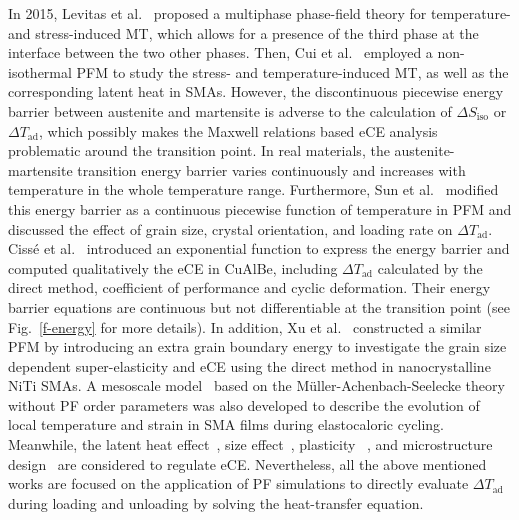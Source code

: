 \documentclass[reprint,3p,sort&compress,times,onecolumn]{elsarticle}
\begin{document}
In 2015, Levitas et al.~\cite{levitas2015multiphase} proposed a multiphase phase-field theory for temperature- and stress-induced MT, which allows for a presence of the third phase at the interface between the two other phases. Then, Cui et al.~\cite{cui2017three} employed a non-isothermal PFM to study the stress- and temperature-induced MT, as well as the corresponding latent heat in SMAs. However, the discontinuous piecewise energy barrier between austenite and martensite is adverse to the calculation of $\Delta S_{\text{iso}}$ or $\Delta T_{\text{ad}}$, which possibly makes the Maxwell relations based eCE analysis problematic around the transition point.
In real materials, the austenite-martensite transition energy barrier varies continuously and increases with temperature in the whole temperature range. Furthermore, Sun et al.~\cite{sun2018phase,sun2019non} modified this energy barrier as a continuous piecewise function of temperature in PFM and discussed the effect of grain size, crystal orientation, and loading rate on $\Delta T_{\text{ad}}$. 
Ciss{\'e} et al.~\cite{cisse2020elastocaloric} introduced an exponential function to express the energy barrier and computed qualitatively the eCE in CuAlBe, including $\Delta T_{\text{ad}}$ calculated by the direct method, coefficient of performance and cyclic deformation. Their energy barrier equations are continuous but not differentiable at the transition point (see Fig.~\ref{f-energy} for more details).
In addition, Xu et al.~\cite{xu2020phase,xu2021phase} constructed a similar PFM by introducing an extra grain boundary energy to investigate the grain size dependent super-elasticity and eCE using the direct method in nanocrystalline NiTi SMAs. A mesoscale model~\cite{wendler2017mesoscale} based on the Müller-Achenbach-Seelecke theory without PF order parameters was also developed to describe the  evolution of local temperature and strain in SMA films during elastocaloric cycling. Meanwhile, the latent heat effect~\cite{cui2017three,sun2019non}, size effect~\cite{sun2018phase,hou2021effect,xu2020phase},  plasticity~\cite{cisse2020elastocaloric,cisse2020asymmetric} , and microstructure design~\cite{xu2021phase,CISSE2021109898} are considered to regulate eCE. 
Nevertheless, all the above mentioned works are focused on the application of PF simulations to directly evaluate $\Delta T_{\text{ad}}$ during loading and unloading by solving the heat-transfer equation. %
\end{document}
